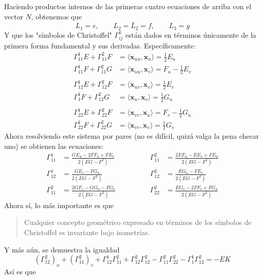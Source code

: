 \documentclass[spanish]{book}
\theoremstyle{definition}
\begin{document}
Haciendo productos internos de las primeras cuatro ecuaciones de arriba con el vector $N$, obtenemos que 
\[L_1=e,\qquad L_2=\bar L_2=f,\qquad L_3=g\]
Y que los "símbolos de Christoffel" $\Gamma^k_{ij}$ están dados en términos únicamente de la primera forma fundamental y sus derivadas. Específicamente:
\begin{align*}
	\Gamma^1_{11}E+\Gamma^2_{11}F&=\langle \mathbf x_{uu},\mathbf x_u\rangle=\frac{1}{2}E_u\\
	\Gamma^1_{11}F+\Gamma^2_{11}G&=\langle \mathbf x_{uu},\mathbf x_v\rangle=F_u-\frac{1}{2}E_v\\\\
	\Gamma^1_{12}E+\Gamma^2_{12}F&=\langle \mathbf x_{uv},\mathbf x_v\rangle=\frac{1}{2}E_v\\
	\Gamma^1_{1}F+\Gamma^2_{12}G&=\langle \mathbf x_{u},\mathbf x_v\rangle=\frac{1}{2}G_u\\ \\
	\Gamma^1_{22}E+\Gamma^2_{22}F&=\langle \mathbf x_{vv},\mathbf x_u\rangle=F_v-\frac{1}{2}G_u\\
	\Gamma^1_{22}F+\Gamma^2_{22}G&=\langle \mathbf x_{vv},\mathbf x_v\rangle=\frac{1}{2}G_v
\end{align*}
Ahora resolviendo este sistema por pares (no es difícil, quizá valga la pena checar uno) se obtienen las ecuaciones:
\[\begin{split}
	\Gamma^1_{11}&=\frac{GE_u-2FF_u+FE_v}{2(EG-F^2)}\\
	\Gamma^1_{12}&=\frac{GE_v-FG_u}{2(EG-F^2)}\\
	\Gamma^2_{11}&=\frac{2GF_v-GG_u-FG_v}{2(EG-F^2)}
\end{split}
\begin{split}
	\qquad\qquad\Gamma^2_{11}&=\frac{2EF_u-EE_v+FE_u}{2(EG-F^2)}\\
	\qquad\qquad \Gamma^2_{12}&=\frac{EG_u-FE_v}{2(EG-F^2)}\\
	\qquad\qquad\Gamma^2_{22}&=\frac{EG_v-2FF_v+FG_u}{2(EG-F^2)}
\end{split}\]
Ahora sí, lo más importante es que
\begin{quote}
	Cualquier concepto geométrico expresado en términos de los símbolos de Christoffel es invariante bajo isometrías.
\end{quote}
Y más aún, se demuestra la igualdad
\[(\Gamma^2_{12})_u+(\Gamma^2_{11})_v+\Gamma^1_{12}\Gamma^2_{11}+\Gamma^2_{12}\Gamma^2_{12}-\Gamma^2_{11}\Gamma^2_{22}-\Gamma^1_{1}\Gamma^2_{12}=-EK\]
Así es que 
\end{document}
